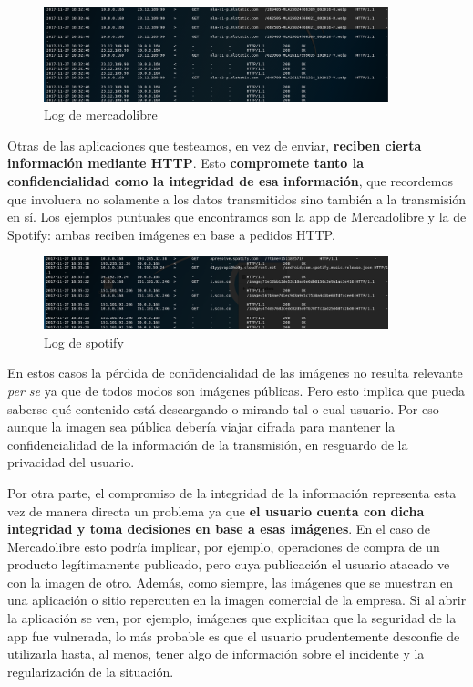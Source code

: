 \begin{figure}
    \centering
    \includegraphics[width=10cm]{img/mercadolibre_httpry.png}
    \caption{Log de mercadolibre}
\end{figure}

Otras de las aplicaciones que testeamos, en vez de enviar, \textbf{reciben cierta información mediante HTTP}. Esto \textbf{compromete tanto la confidencialidad 
como la integridad de esa información}, que recordemos que involucra no solamente a los datos transmitidos sino también a la transmisión en sí. 
Los ejemplos puntuales que encontramos son la app de Mercadolibre y la de Spotify: ambas reciben imágenes en base a pedidos HTTP.

\begin{figure}
    \centering
    \includegraphics[width=10cm]{img/spotify_httpry.png}
    \caption{Log de spotify}
\end{figure}

En estos casos la pérdida de confidencialidad de las imágenes no resulta relevante \textit{per se} ya que de todos modos son imágenes públicas. 
Pero esto implica que pueda saberse qué contenido está descargando o mirando tal o cual usuario. Por eso aunque la imagen sea pública debería 
viajar cifrada para mantener la confidencialidad de la información de la transmisión, en resguardo de la privacidad del usuario. 

Por otra parte, el compromiso de la integridad de la información representa esta vez de manera directa un problema ya que \textbf{el usuario cuenta 
con dicha integridad y toma decisiones en base a esas imágenes}. En el caso de Mercadolibre esto podría implicar, por ejemplo, operaciones de 
compra de un producto legítimamente publicado, pero cuya publicación el usuario atacado ve con la imagen de otro. Además, como siempre, las 
imágenes que se muestran en una aplicación o sitio repercuten en la imagen comercial de la empresa. Si al abrir la aplicación se ven, por 
ejemplo, imágenes que explicitan que la seguridad de la app fue vulnerada, lo más probable es que el usuario prudentemente desconfie de 
utilizarla hasta, al menos, tener algo de información sobre el incidente y la regularización de la situación.



